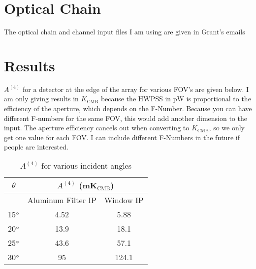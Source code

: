 \documentclass{article}
\theoremstyle{remark}
\newcommand{\A}[1]{A^{(#1)}}
\begin{document}
\section{Optical Chain}
The optical chain and channel input files I am using are given in Grant's emails


\section{Results}
$\A4$ for a detector at the edge of the array for various FOV's are given below.
I am only giving results in $K_\text{CMB}$ because the HWPSS in pW is proportional to the efficiency of the aperture,
which depends on the F-Number.
Because you can have different F-numbers for the same FOV, this would add another dimension to the input.
The aperture efficiency cancels out when converting to $K_\text{CMB}$, so we only get one value for each FOV.
I can include different F-Numbers in the future if people are interested.

\begin{table}[h]
\centering

\begin{tabular}{|c|c|c|}
\hline
$\theta$ & \multicolumn{2}{|c|}{$\A4 $ (mK$_\text{CMB}$)} \\
\hline
      & Aluminum Filter IP   & Window IP            \\
\hline
15$\degree$  & 4.52  & 5.88 \\
20$\degree$  & 13.9 & 18.1  \\
25$\degree$  & 43.6 & 57.1   \\
30$\degree$  & 95 & 124.1 \\\hline
\end{tabular}
\caption{ $\A4$ for various incident angles
}
\label{table:HWPSS}
\end{table}
\end{document}
